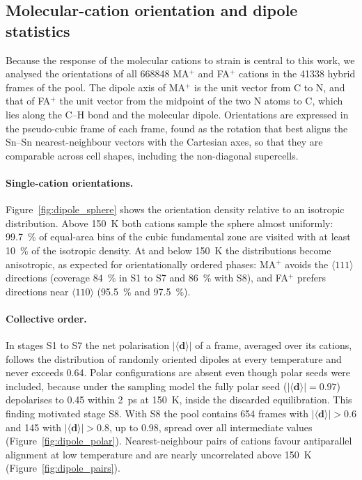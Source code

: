 \subsection{Molecular-cation orientation and dipole statistics}
\label{sec:configgen:dipoles}

Because the response of the molecular cations to strain is central to this work, we analysed the
orientations of all \num{668848} MA$^+$ and FA$^+$ cations in the \num{41338} hybrid frames of the pool.
The dipole axis of MA$^+$ is the unit vector from C to N, and that of FA$^+$ the unit vector from the
midpoint of the two N atoms to C, which lies along the C--H bond and the molecular dipole. Orientations
are expressed in the pseudo-cubic frame of each frame, found as the rotation that best aligns the
Sn--Sn nearest-neighbour vectors with the Cartesian axes, so that they are comparable across cell
shapes, including the non-diagonal supercells.

\paragraph{Single-cation orientations.} Figure~\ref{fig:dipole_sphere} shows the orientation density
relative to an isotropic distribution. Above \SI{150}{\kelvin} both cations sample the sphere almost
uniformly: \SI{99.7}{\percent} of equal-area bins of the cubic fundamental zone are visited with at
least \SI{10}{\percent} of the isotropic density. At and below \SI{150}{\kelvin} the distributions
become anisotropic, as expected for orientationally ordered phases: MA$^+$ avoids the
$\langle111\rangle$ directions (coverage \SI{84}{\percent} in S1 to S7 and \SI{86}{\percent} with S8),
and FA$^+$ prefers directions near $\langle110\rangle$ (\SI{95.5}{\percent} and \SI{97.5}{\percent}).

\paragraph{Collective order.} In stages S1 to S7 the net polarisation $|\langle\mathbf{d}\rangle|$ of a
frame, averaged over its cations, follows the distribution of randomly oriented dipoles at every
temperature and never exceeds 0.64. Polar configurations are absent even though polar seeds were
included, because under the sampling model the fully polar \MASnI{} seed
($|\langle\mathbf{d}\rangle|=0.97$) depolarises to 0.45 within \SI{2}{\pico\second} at
\SI{150}{\kelvin}, inside the discarded equilibration. This finding motivated stage S8. With S8 the
pool contains 654 frames with $|\langle\mathbf{d}\rangle|>0.6$ and 145 with
$|\langle\mathbf{d}\rangle|>0.8$, up to 0.98, spread over all intermediate values
(Figure~\ref{fig:dipole_polar}). Nearest-neighbour pairs of cations favour antiparallel alignment at
low temperature and are nearly uncorrelated above \SI{150}{\kelvin} (Figure~\ref{fig:dipole_pairs}).

